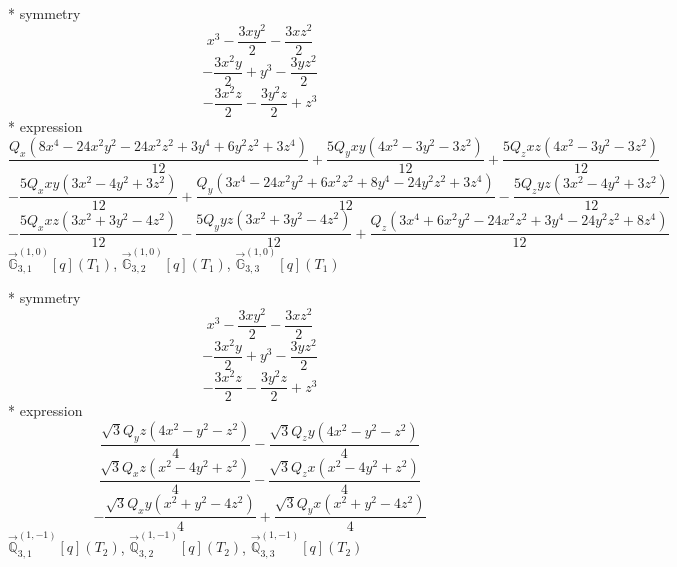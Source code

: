 \documentclass[fleqn,8pt]{jsarticle}
\begin{document}
\noindent\quad ** symmetry
\begin{dmath*}
x^{3} - \frac{3 x y^{2}}{2} - \frac{3 x z^{2}}{2}
\end{dmath*}
\begin{dmath*}
- \frac{3 x^{2} y}{2} + y^{3} - \frac{3 y z^{2}}{2}
\end{dmath*}
\begin{dmath*}
- \frac{3 x^{2} z}{2} - \frac{3 y^{2} z}{2} + z^{3}
\end{dmath*}
\noindent\quad ** expression
\begin{dmath*}
\frac{Q_{x} \left(8 x^{4} - 24 x^{2} y^{2} - 24 x^{2} z^{2} + 3 y^{4} + 6 y^{2} z^{2} + 3 z^{4}\right)}{12} + \frac{5 Q_{y} x y \left(4 x^{2} - 3 y^{2} - 3 z^{2}\right)}{12} + \frac{5 Q_{z} x z \left(4 x^{2} - 3 y^{2} - 3 z^{2}\right)}{12}
\end{dmath*}
\begin{dmath*}
- \frac{5 Q_{x} x y \left(3 x^{2} - 4 y^{2} + 3 z^{2}\right)}{12} + \frac{Q_{y} \left(3 x^{4} - 24 x^{2} y^{2} + 6 x^{2} z^{2} + 8 y^{4} - 24 y^{2} z^{2} + 3 z^{4}\right)}{12} - \frac{5 Q_{z} y z \left(3 x^{2} - 4 y^{2} + 3 z^{2}\right)}{12}
\end{dmath*}
\begin{dmath*}
- \frac{5 Q_{x} x z \left(3 x^{2} + 3 y^{2} - 4 z^{2}\right)}{12} - \frac{5 Q_{y} y z \left(3 x^{2} + 3 y^{2} - 4 z^{2}\right)}{12} + \frac{Q_{z} \left(3 x^{4} + 6 x^{2} y^{2} - 24 x^{2} z^{2} + 3 y^{4} - 24 y^{2} z^{2} + 8 z^{4}\right)}{12}
\end{dmath*}
\noindent\quad $\vec{\mathbb{G}}_{3,1}^{(1,0)}[q](T_{1})$, $\vec{\mathbb{G}}_{3,2}^{(1,0)}[q](T_{1})$, $\vec{\mathbb{G}}_{3,3}^{(1,0)}[q](T_{1})$

\noindent\quad ** symmetry
\begin{dmath*}
x^{3} - \frac{3 x y^{2}}{2} - \frac{3 x z^{2}}{2}
\end{dmath*}
\begin{dmath*}
- \frac{3 x^{2} y}{2} + y^{3} - \frac{3 y z^{2}}{2}
\end{dmath*}
\begin{dmath*}
- \frac{3 x^{2} z}{2} - \frac{3 y^{2} z}{2} + z^{3}
\end{dmath*}
\noindent\quad ** expression
\begin{dmath*}
\frac{\sqrt{3} Q_{y} z \left(4 x^{2} - y^{2} - z^{2}\right)}{4} - \frac{\sqrt{3} Q_{z} y \left(4 x^{2} - y^{2} - z^{2}\right)}{4}
\end{dmath*}
\begin{dmath*}
\frac{\sqrt{3} Q_{x} z \left(x^{2} - 4 y^{2} + z^{2}\right)}{4} - \frac{\sqrt{3} Q_{z} x \left(x^{2} - 4 y^{2} + z^{2}\right)}{4}
\end{dmath*}
\begin{dmath*}
- \frac{\sqrt{3} Q_{x} y \left(x^{2} + y^{2} - 4 z^{2}\right)}{4} + \frac{\sqrt{3} Q_{y} x \left(x^{2} + y^{2} - 4 z^{2}\right)}{4}
\end{dmath*}
\noindent\quad $\vec{\mathbb{Q}}_{3,1}^{(1,-1)}[q](T_{2})$, $\vec{\mathbb{Q}}_{3,2}^{(1,-1)}[q](T_{2})$, $\vec{\mathbb{Q}}_{3,3}^{(1,-1)}[q](T_{2})$
\end{document}
